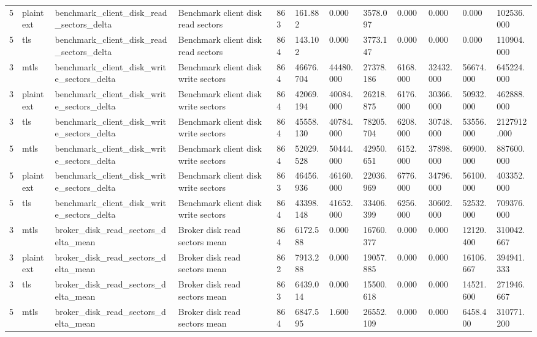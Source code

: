 \begin{longtable}{llllllllllll}
5 & plaintext & benchmark\_client\_disk\_read\_sectors\_delta & Benchmark client disk read sectors & 863 & 161.882 & 0.000 & 3578.097 & 0.000 & 0.000 & 0.000 & 102536.000 \\
5 & tls & benchmark\_client\_disk\_read\_sectors\_delta & Benchmark client disk read sectors & 864 & 143.102 & 0.000 & 3773.147 & 0.000 & 0.000 & 0.000 & 110904.000 \\
3 & mtls & benchmark\_client\_disk\_write\_sectors\_delta & Benchmark client disk write sectors & 864 & 46676.704 & 44480.000 & 27378.186 & 6168.000 & 32432.000 & 56674.000 & 645224.000 \\
3 & plaintext & benchmark\_client\_disk\_write\_sectors\_delta & Benchmark client disk write sectors & 864 & 42069.194 & 40084.000 & 26218.875 & 6176.000 & 30366.000 & 50932.000 & 462888.000 \\
3 & tls & benchmark\_client\_disk\_write\_sectors\_delta & Benchmark client disk write sectors & 864 & 45558.130 & 40784.000 & 78205.704 & 6208.000 & 30748.000 & 53556.000 & 2127912.000 \\
5 & mtls & benchmark\_client\_disk\_write\_sectors\_delta & Benchmark client disk write sectors & 864 & 52029.528 & 50444.000 & 42950.651 & 6152.000 & 37898.000 & 60900.000 & 887600.000 \\
5 & plaintext & benchmark\_client\_disk\_write\_sectors\_delta & Benchmark client disk write sectors & 863 & 46456.936 & 46160.000 & 22036.969 & 6776.000 & 34796.000 & 56100.000 & 403352.000 \\
5 & tls & benchmark\_client\_disk\_write\_sectors\_delta & Benchmark client disk write sectors & 864 & 43398.148 & 41652.000 & 33406.399 & 6256.000 & 30602.000 & 52532.000 & 709376.000 \\
3 & mtls & broker\_disk\_read\_sectors\_delta\_mean & Broker disk read sectors mean & 864 & 6172.588 & 0.000 & 16760.377 & 0.000 & 0.000 & 12120.400 & 310042.667 \\
3 & plaintext & broker\_disk\_read\_sectors\_delta\_mean & Broker disk read sectors mean & 862 & 7913.288 & 0.000 & 19057.885 & 0.000 & 0.000 & 16106.667 & 394941.333 \\
3 & tls & broker\_disk\_read\_sectors\_delta\_mean & Broker disk read sectors mean & 863 & 6439.014 & 0.000 & 15500.618 & 0.000 & 0.000 & 14521.600 & 271946.667 \\
5 & mtls & broker\_disk\_read\_sectors\_delta\_mean & Broker disk read sectors mean & 864 & 6847.595 & 1.600 & 26552.109 & 0.000 & 0.000 & 6458.400 & 310771.200 \\

\end{longtable}
